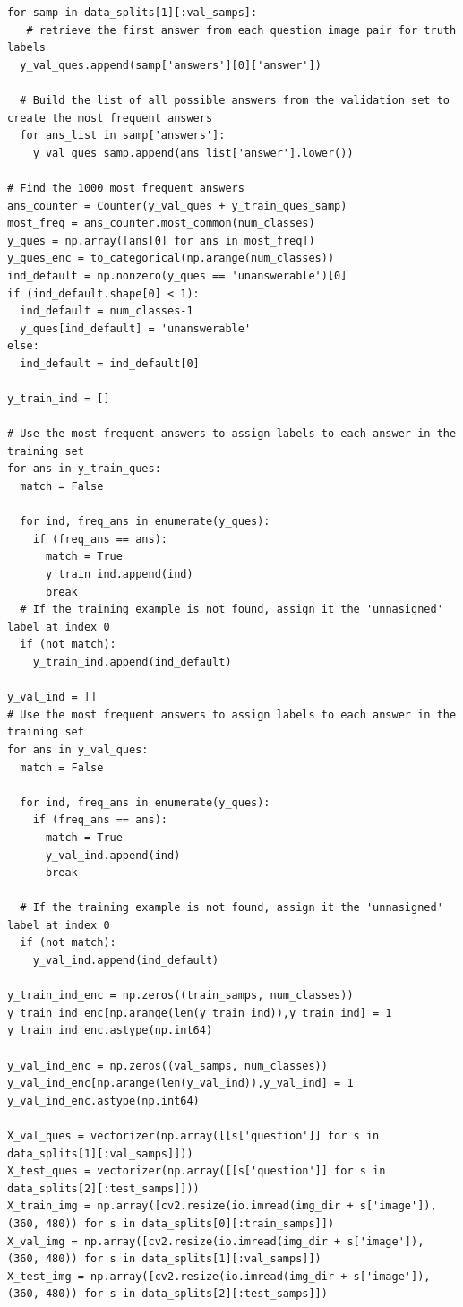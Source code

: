 \documentclass[12pt]{article}
\begin{document}
\begin{lstlisting}[breaklines=true]
for samp in data_splits[1][:val_samps]:
   # retrieve the first answer from each question image pair for truth labels
  y_val_ques.append(samp['answers'][0]['answer'])
  
  # Build the list of all possible answers from the validation set to create the most frequent answers
  for ans_list in samp['answers']:
    y_val_ques_samp.append(ans_list['answer'].lower())

# Find the 1000 most frequent answers
ans_counter = Counter(y_val_ques + y_train_ques_samp)
most_freq = ans_counter.most_common(num_classes)
y_ques = np.array([ans[0] for ans in most_freq])
y_ques_enc = to_categorical(np.arange(num_classes))
ind_default = np.nonzero(y_ques == 'unanswerable')[0]
if (ind_default.shape[0] < 1):
  ind_default = num_classes-1
  y_ques[ind_default] = 'unanswerable'
else:
  ind_default = ind_default[0]

y_train_ind = []

# Use the most frequent answers to assign labels to each answer in the training set
for ans in y_train_ques:
  match = False

  for ind, freq_ans in enumerate(y_ques):
    if (freq_ans == ans):
      match = True
      y_train_ind.append(ind)
      break
  # If the training example is not found, assign it the 'unnasigned' label at index 0
  if (not match):
    y_train_ind.append(ind_default)

y_val_ind = []
# Use the most frequent answers to assign labels to each answer in the training set
for ans in y_val_ques:
  match = False

  for ind, freq_ans in enumerate(y_ques):
    if (freq_ans == ans):
      match = True
      y_val_ind.append(ind)
      break

  # If the training example is not found, assign it the 'unnasigned' label at index 0
  if (not match):
    y_val_ind.append(ind_default)

y_train_ind_enc = np.zeros((train_samps, num_classes))
y_train_ind_enc[np.arange(len(y_train_ind)),y_train_ind] = 1
y_train_ind_enc.astype(np.int64)

y_val_ind_enc = np.zeros((val_samps, num_classes))
y_val_ind_enc[np.arange(len(y_val_ind)),y_val_ind] = 1
y_val_ind_enc.astype(np.int64)

X_val_ques = vectorizer(np.array([[s['question']] for s in data_splits[1][:val_samps]]))
X_test_ques = vectorizer(np.array([[s['question']] for s in data_splits[2][:test_samps]]))
X_train_img = np.array([cv2.resize(io.imread(img_dir + s['image']), (360, 480)) for s in data_splits[0][:train_samps]])
X_val_img = np.array([cv2.resize(io.imread(img_dir + s['image']), (360, 480)) for s in data_splits[1][:val_samps]])
X_test_img = np.array([cv2.resize(io.imread(img_dir + s['image']), (360, 480)) for s in data_splits[2][:test_samps]])


\end{lstlisting}
\end{document}

